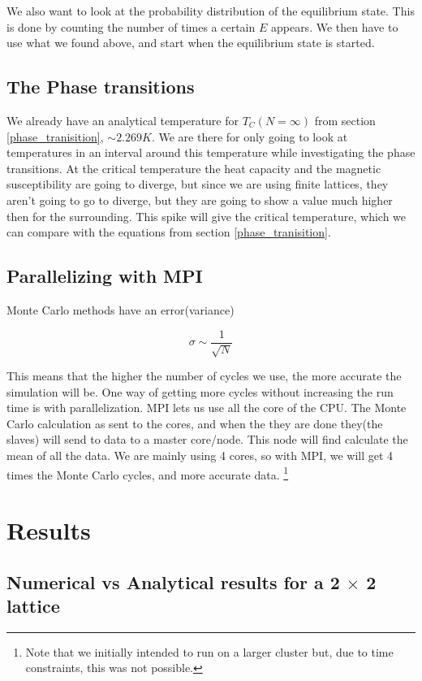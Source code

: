 \documentclass[a4paper, 10pt]{article}
\begin{document}
We also want to look at the probability distribution of the equilibrium state. This is done by counting the number of times a certain $E$ appears. We then have to use what we found above, and start when the equilibrium state is started.

\subsection{The Phase transitions}
We already have an analytical temperature for $T_C(N=\infty)$ from section \ref{phase_tranisition}, $\sim 2.269 K$. We are there for only going to look at temperatures in an interval around this temperature while investigating the phase transitions. At the critical temperature the heat capacity and the magnetic susceptibility are going to diverge, but since we are using finite lattices, they aren't going to go to diverge, but they are going to show a value much higher then for the surrounding. This spike will give the critical temperature, which we can compare with the equations from section \ref{phase_tranisition}.


\subsection{Parallelizing with MPI}
Monte Carlo methods have an error(variance) 

$$
\sigma \sim \frac{1}{\sqrt{N}}
$$

This means that the higher the number of cycles we use, the more accurate the simulation will be. One way of getting more cycles without increasing the run time is with parallelization. MPI lets us use all the core of the CPU. The Monte Carlo calculation as sent to the cores, and when the they are done they(the slaves) will send to data to a master core/node. This node will find calculate the mean of all the data. We are mainly using 4 cores, so with MPI, we will get 4 times the Monte Carlo cycles, and more accurate data. \footnote{Note that we initially intended to run on a larger cluster but, due to time constraints, this was not possible.}

\section{Results}

\subsection{Numerical vs Analytical results for a 2 $\times$ 2 lattice}
\end{document}
